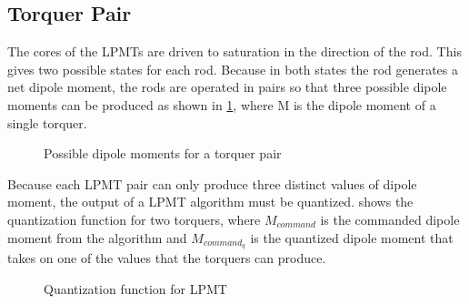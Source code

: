 \subsection{Torquer Pair}


The cores of the \acp{LPMT} are driven to saturation in the direction of the rod. This gives two possible states for each rod. Because in both states the rod generates a net dipole moment, the rods are operated in pairs so that three possible dipole moments can be produced as shown in \cref{fig:moments}, where M is the dipole moment of a single torquer.

\begin{figure}[H]
    \centering
    \caption{Possible dipole moments for a torquer pair}
    \label{fig:moments}
\end{figure}

Because each \ac{LPMT} pair can only produce three distinct values of dipole moment, the output of a \ac{LPMT} algorithm must be quantized.  shows the quantization function for two torquers, where $M_{command}$ is the commanded dipole moment from the algorithm and $M_{command_q}$ is the quantized dipole moment that takes on one of the values that the torquers can produce.

\begin{figure}[H]
    \centering
    \caption{Quantization function for \acs*{LPMT}}
    \label{fig:lpmtq}
\end{figure}

